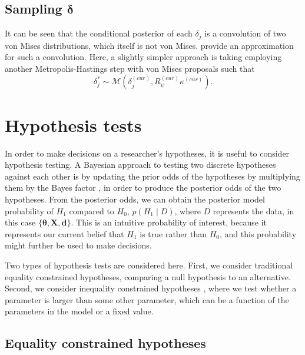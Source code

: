 \documentclass[11pt,a4paper]{article}\usepackage[]{graphicx}\usepackage[]{color}
\newcommand{\bX}{\boldsymbol{X}}
\newcommand{\bt}{\boldsymbol{\theta}}
\newcommand{\bd}{\boldsymbol{d}}
\newcommand{\bdt}{\boldsymbol{\delta}}
\newcommand{\thedata}{\bt, \bX, \bd}
\begin{document}
\subsection{Sampling $\bdt$}

It can be seen that the conditional posterior of each \( \delta_j \) is a convolution of two von Mises distributions, which itself is not von Mises. \citet[p. 44]{mardia1999directional} provide an approximation for such a convolution. Here, a slightly simpler approach is taking employing another Metropolis-Hastings step with von Mises proposals such that
\begin{equation}
\delta_j^{*} \sim \mathcal{M} \left( \delta_j^{(cur)}, R_\psi^{(cur)} \kappa^{(cur)} \right).
\end{equation}


\section{Hypothesis tests}

\label{hypothesis}

In order to make decisions on a researcher's hypotheses, it is useful to consider hypothesis testing. A Bayesian approach to testing two discrete hypotheses against each other is by updating the prior odds of the hypotheses by multiplying them by the Bayes factor \citep{kass1995bayes, jeffreys1961theory}, in order to produce the posterior odds of the two hypotheses.
From the posterior odds, we can obtain the posterior model probability of \( H_1 \) compared to \( H_0 \), \( p(H_1 \mid D) \), where \( D \) represents the data, in this case \( \{ \thedata \} \). This is an intuitive probability of interest, because it represents our current belief that \( H_1 \) is true rather than \( H_0 \), and this probability might further be used to make decisions.


Two types of hypothesis tests are considered here. First, we consider traditional equality constrained hypotheses, comparing a null hypothesis to an alternative. Second, we consider inequality constrained hypotheses \citep{hoijtink2008bayesian, hoijtink2011informative}, where we test whether a parameter is larger than some other parameter, which can be a function of the parameters in the model or a fixed value.

\subsection{Equality constrained hypotheses}
\end{document}
